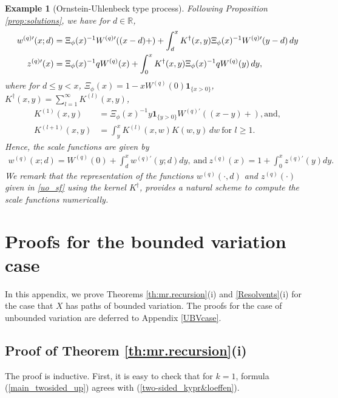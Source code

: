 \documentclass[12pt,reqno]{amsart}
\newcommand{\red}{\textcolor[rgb]{1.00,0.00,0.00}}
\newtheorem{example}{Example}
\theoremstyle{definition}
\theoremstyle{remark}
\newcommand{\ind}{\mathbf{1}}
\begin{document}
\begin{example}[Ornstein-Uhlenbeck type process]
Following Proposition \ref{prop:solutions},  we have for $d\in\mathbb{R}$,
\begin{align}\label{uo_sf}
w^{(q)\prime}(x;d)&=\Xi_{\phi}(x)^{-1}W^{(q)\prime}((x-d)+)+\int_d^x K^{\dagger}(x,y)\Xi_{\phi}(x)^{-1}W^{(q)\prime}(y-d)\,dy\notag\\
z^{(q)\prime}(x)&= \Xi_{\phi}(x)^{-1} qW^{(q)}(x)+\int_0^x K^{\dagger}(x,y)\Xi_{\phi}(x)^{-1}qW^{(q)}(y)\,dy,
\end{align}
where for $d\leq y<x$, $\Xi_{\phi}(x)=1-xW^{(q)}(0)\ind_{\{x>0\}}$, $K^{\dagger}(x,y)=\sum_{l=1}^\infty K^{(l)}(x,y)$,
\begin{align*}
K^{(1)}(x,y)&=\Xi_{\phi}(x)^{-1} y\ind_{\{y>0\}} W^{(q)\prime}((x-y)+), \text{and},\\ K^{(l+1)}(x,y)&=\int_y^xK^{(l)}(x,w)K(w,y)\,dw \ \text{for $l\geq 1$.}
\end{align*}
Hence, the scale functions are given by
\begin{align*}
w^{(q)}(x;d)=W^{(q)}(0)+\int_d^xw^{(q)\prime}(y;d)dy, \ \text{and} \ z^{(q)}(x) =1+\int_0^xz^{(q)\prime}(y)dy .
\end{align*}
We remark that the representation of the functions $w^{(q)}(\cdot,d)$ and $z^{(q)}(\cdot)$ given in \eqref{uo_sf} using the kernel $K^{\dagger}$, provides a natural scheme to compute the scale functions numerically.
\end{example}


\appendix
\section{Proofs for the bounded variation case}\label{BVcase}

In this appendix, we prove Theorems \ref{th:mr.recursion}(i) and \ref{Resolvents}(i) for the case that $X$ has paths of bounded variation. 
The proofs for the case of unbounded variation are deferred to Appendix \ref{UBVcase}.

\subsection{Proof of Theorem \ref{th:mr.recursion}(i) }
The proof is inductive. First, it is easy to check that for $k=1$, formula (\ref{main_twosided_up}) agrees with (\ref{two-sided_kypr&loeffen}). 
\end{document}
